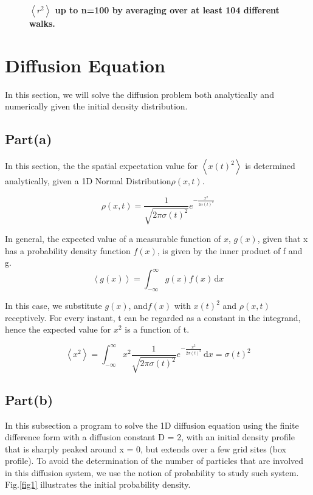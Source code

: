 \documentclass[11pt, oneside]{article}   	%
\begin{document}
\begin{figure}[h]
\begin{center}
\caption{{\bf $\left \langle r^2 \right\rangle$ up to n=100 by averaging over at least 104 different walks. }}
\label{figrw1}
\end{center}
\end{figure}







\section{Diffusion Equation}
In this section, we will solve the diffusion problem both analytically and numerically given the initial density distribution.
\subsection{Part(a)}
In this section, the the spatial expectation value for $\left \langle x(t)^2 \right\rangle$ is determined analytically, given a 1D Normal Distribution$\rho(x,t)$.

\begin{equation*}
\rho(x,t)=\frac{1}{\sqrt{2\pi \sigma(t)^2}}e^{-\frac{x^2}{2\sigma(t)^2}}
\end{equation*}

In general, the expected value of a measurable function of $x$, $g(x)$, given that x has a probability density function $f(x)$, is given by the inner product of f and g.
\begin{equation*}
\left \langle g(x) \right\rangle= \int_{-\infty}^{\infty} g(x)f(x)\, \mathrm{d}x
\end{equation*}

In this case, we substitute $g(x)$, and$f(x)$ with $x(t)^2$ and $\rho(x,t)$ receptively. For every instant, t can be regarded as a constant in the integrand, hence the expected value for $x^2$ is a function of t.

\begin{equation*}
\left \langle x^2 \right\rangle= \int_{-\infty}^{\infty} x^2\frac{1}{\sqrt{2\pi \sigma(t)^2}}e^{-\frac{x^2}{2\sigma(t)^2}}\, \mathrm{d}x=\sigma(t)^2
\end{equation*}

\subsection{Part(b)}
In this subsection a program to solve the 1D diffusion equation using the finite difference form with a diffusion constant D = 2, with an initial density profile that is sharply peaked around x = 0, but extends over a few grid sites (box profile). To avoid the determination of the number of  particles  that are involved in this diffusion system, we use the notion of probability to study such system. Fig.\ref{fig1} illustrates the initial probability density.
\end{document}
